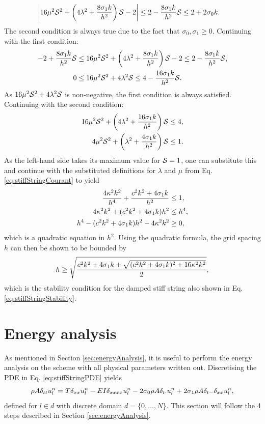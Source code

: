 {\begin{equation}
\begin{aligned}
        \left|16\mu^2\S^2+\left(4\lambda^2+\frac{8\so k}{h^2}\right)\S - 2\right|&\leq2-\frac{8\so k}{h^2}\S\leq2+2\sz k.
    \end{aligned}
\end{equation}
The second condition is always true due to the fact that $\sigma_0,\sigma_1 \geq 0$. Continuing with the first condition: 
\begin{align*}
    -2+\frac{8\so k}{h^2}\S&\leq 16\mu^2\S^2+\left(4\lambda^2+\frac{8\so k}{h^2}\right)\S - 2\leq 2-\frac{8\so k}{h^2}\S,\\
    0&\leq 16\mu^2\S^2+4\lambda^2\S\leq 4-\frac{16\so k}{h^2}\S.
\end{align*}
As $16\mu^2\S^2+4\lambda^2\S$ is non-negative, the first condition is always satisfied. Continuing with the second condition:
\begin{align*}
    16\mu^2\S^2+\left(4\lambda^2+ \frac{16\so k}{h^2}\right)\S &\leq 4,\\
    4\mu^2\S^2+\left(\lambda^2+ \frac{4\so k}{h^2}\right)\S&\leq 1.
\end{align*}
As the left-hand side takes its maximum value for $\S= 1$, one can substitute this and continue with the substituted definitions for $\lambda$ and $\mu$ from Eq. \eqref{eq:stiffStringCourant} to yield
\begin{align*}
    \frac{4\kappa^2k^2}{h^4}+\frac{c^2k^2 + 4\so k}{h^2}&\leq 1, \\
    4\kappa^2k^2+(c^2k^2+ 4\so k)h^2&\leq h^4,\\
    h^4- (c^2k^2+ 4\so k)h^2 - 4\kappa^2k^2 &\geq 0 ,
\end{align*}
which is a quadratic equation in $h^2$. Using the quadratic formula, the grid spacing $h$ can then be shown to be bounded by
\begin{equation}
    h \geq \sqrt{\frac{c^2k^2+4\so k + \sqrt{(c^2k^2 + 4\so k)^2+16\kappa^2k^2}}{2}},
\end{equation}
which is the stability condition for the damped stiff string also shown in Eq. \eqref{eq:stiffStringStability}.

\section{Energy analysis}\label{sec:energyAnalysisString}
As mentioned in Section \ref{sec:energyAnalysis}, it is useful to perform the energy analysis on the scheme with all physical parameters written out. Discretising the PDE in Eq. \eqref{eq:stiffStringPDE} yields
\begin{equation}
    \rho A \dtt \uln = T \dxx \uln - EI \dxxxx \uln - 2\sz \rho A \dtd \uln + 2 \so \rho A \dtm \dxx \uln,
\end{equation}
defined for $l\in d$ with discrete domain $d = \{0, \hdots, N\}$. This section will follow the 4 steps described in Section \ref{sec:energyAnalysis}.

}
